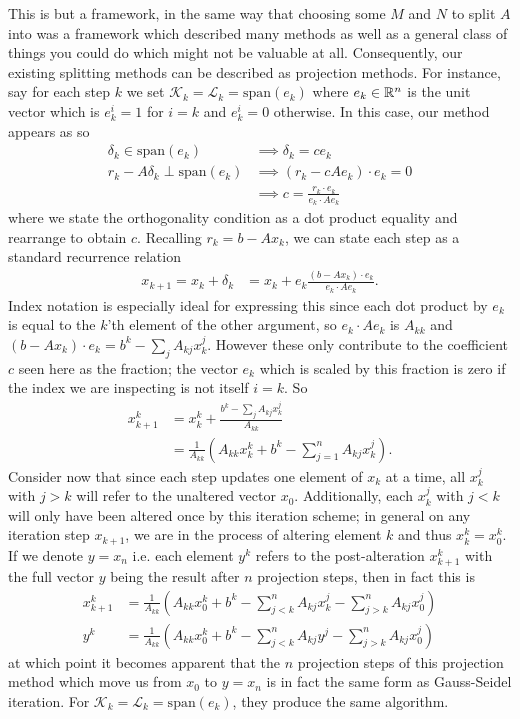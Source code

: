 \documentclass[11pt]{article}
\begin{document}
This is but a framework, in the same way that choosing some $M$ and $N$ to split $A$ into was a framework which described many methods as well as a general class of things you could do which might not be valuable at all. Consequently, our existing splitting methods can be described as projection methods. For instance, say for each step $k$ we set $\mathcal{K}_k = \mathcal{L}_k = \mathrm{span}(e_k)$ where $e_k \in \mathbb{R}^n$ is the unit vector which is $e_k^i = 1$ for $i = k$ and $e_k^{i} = 0$ otherwise. In this case, our method appears as so \begin{align*}
\delta_k \in \mathrm{span}(e_k) &\implies \delta_k = c e_k \\
r_k - A \delta_k \perp \mathrm{span}(e_k) &\implies (r_k - c A e_k ) \cdot e_k = 0 \\
& \implies c = \frac{r_k \cdot e_k}{e_k \cdot A e_k}
\end{align*}
where we state the orthogonality condition as a dot product equality and rearrange to obtain $c$. Recalling $r_k = b - A x_k$, we can state each step as a standard recurrence relation \begin{align*}
x_{k+1} = x_k + \delta_k &= x_k + e_k \frac{(b - A x_k) \cdot e_k}{e_k \cdot A e_k}.
\end{align*}
Index notation is especially ideal for expressing this since each dot product by $e_k$ is equal to the $k$'th element of the other argument, so $e_k \cdot A e_k$ is $A_{kk}$ and $(b - Ax_k) \cdot e_k = b^k - \sum_j A_{kj} x_k^j$. However these only contribute to the coefficient $c$ seen here as the fraction; the vector $e_k$ which is scaled by this fraction is zero if the index we are inspecting is not itself $i = k$. So \begin{align*}
x_{k+1}^k &= x_k^k + \frac{b^k - \sum_j A_{kj} x_k^j}{A_{kk}} \\
 &= \frac{1}{A_{kk}} \left( A_{kk} x_k^k + b^k - \sum_{j=1}^n A_{kj} x^j_k \right).
\end{align*}
Consider now that since each step updates one element of $x_k$ at a time, all $x_k^j$ with $j > k$ will refer to the unaltered vector $x_0$. Additionally, each $x_k^j$ with $j < k$ will only have been altered once by this iteration scheme; in general on  any iteration step $x_{k+1}$, we are in the process of altering element $k$ and thus $x_k^k = x_0^k$. If we denote $y = x_n$ i.e. each element $y^k$ refers to the post-alteration $x^k_{k+1}$ with the full vector $y$ being the result after $n$ projection steps, then in fact this is \begin{align*}
x_{k+1}^k &= \frac{1}{A_{kk}} \left( A_{kk} x_0^k + b^k - \sum_{j<k}^n A_{kj} x^j_k - \sum_{j>k}^n A_{kj} x^j_0 \right) \\
y^k &= \frac{1}{A_{kk}} \left( A_{kk} x_0^k + b^k - \sum_{j<k}^n A_{kj} y^j - \sum_{j>k}^n A_{kj} x^j_0 \right)
\end{align*}
at which point it becomes apparent that the $n$ projection steps of this projection method which move us from $x_0$ to $y = x_n$ is in fact the same form as Gauss-Seidel iteration. For $\mathcal{K}_k = \mathcal{L}_k = \mathrm{span}(e_k)$, they produce the same algorithm.
\end{document}
